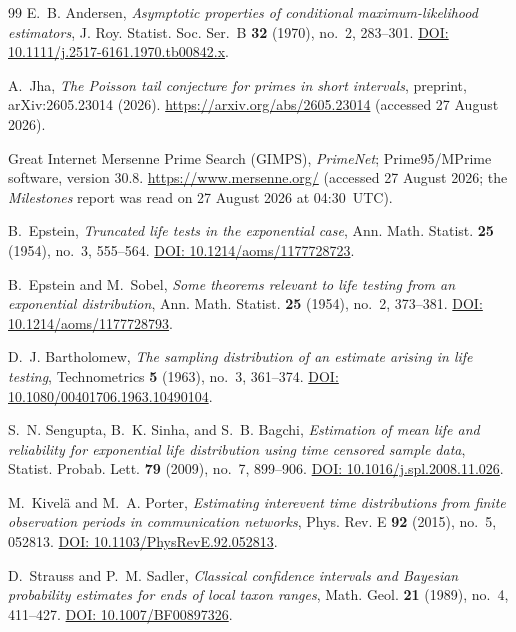 \documentclass[11pt,a4paper]{article}
\theoremstyle{plain}
\theoremstyle{remark}
\begin{document}
\begin{thebibliography}{99}
 E.~B. Andersen, \emph{Asymptotic properties of
conditional maximum-likelihood estimators}, J. Roy. Statist. Soc. Ser.~B
\textbf{32} (1970), no.~2, 283--301.
\href{https://doi.org/10.1111/j.2517-6161.1970.tb00842.x}{DOI:
10.1111/j.2517-6161.1970.tb00842.x}.

 A.~Jha, \emph{The Poisson tail conjecture for primes in short
intervals}, preprint, arXiv:2605.23014 (2026).
\url{https://arxiv.org/abs/2605.23014} (accessed 27 August 2026).

 Great Internet Mersenne Prime Search (GIMPS), \emph{PrimeNet};
Prime95/MPrime software, version 30.8. \url{https://www.mersenne.org/}
(accessed 27 August 2026; the \emph{Milestones} report was read on
27 August 2026 at 04:30~UTC).

 B.~Epstein, \emph{Truncated life tests in the
exponential case}, Ann. Math. Statist. \textbf{25} (1954), no.~3, 555--564.
\href{https://doi.org/10.1214/aoms/1177728723}{DOI: 10.1214/aoms/1177728723}.

 B.~Epstein and M.~Sobel, \emph{Some theorems
relevant to life testing from an exponential distribution}, Ann. Math. Statist.
\textbf{25} (1954), no.~2, 373--381.
\href{https://doi.org/10.1214/aoms/1177728793}{DOI: 10.1214/aoms/1177728793}.

 D.~J. Bartholomew, \emph{The sampling distribution of
an estimate arising in life testing}, Technometrics \textbf{5} (1963), no.~3,
361--374.
\href{https://doi.org/10.1080/00401706.1963.10490104}{DOI:
10.1080/00401706.1963.10490104}.

 S.~N. Sengupta, B.~K. Sinha, and S.~B. Bagchi,
\emph{Estimation of mean life and reliability for exponential life distribution
using time censored sample data}, Statist. Probab. Lett. \textbf{79} (2009),
no.~7, 899--906.
\href{https://doi.org/10.1016/j.spl.2008.11.026}{DOI:
10.1016/j.spl.2008.11.026}.

 M.~Kivel\"{a} and M.~A. Porter, \emph{Estimating interevent
time distributions from finite observation periods in communication networks},
Phys. Rev. E \textbf{92} (2015), no.~5, 052813.
\href{https://doi.org/10.1103/PhysRevE.92.052813}{DOI:
10.1103/PhysRevE.92.052813}.

 D.~Strauss and P.~M. Sadler, \emph{Classical
confidence intervals and Bayesian probability estimates for ends of local taxon
ranges}, Math. Geol. \textbf{21} (1989), no.~4, 411--427.
\href{https://doi.org/10.1007/BF00897326}{DOI: 10.1007/BF00897326}.


\end{thebibliography}
\end{document}
